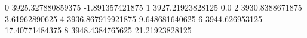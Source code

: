 0 3925.327880859375 -1.891357421875
1 3927.21923828125 0.0
2 3930.8388671875 3.61962890625
4 3936.867919921875 9.648681640625
6 3944.626953125 17.40771484375
8 3948.4384765625 21.21923828125
